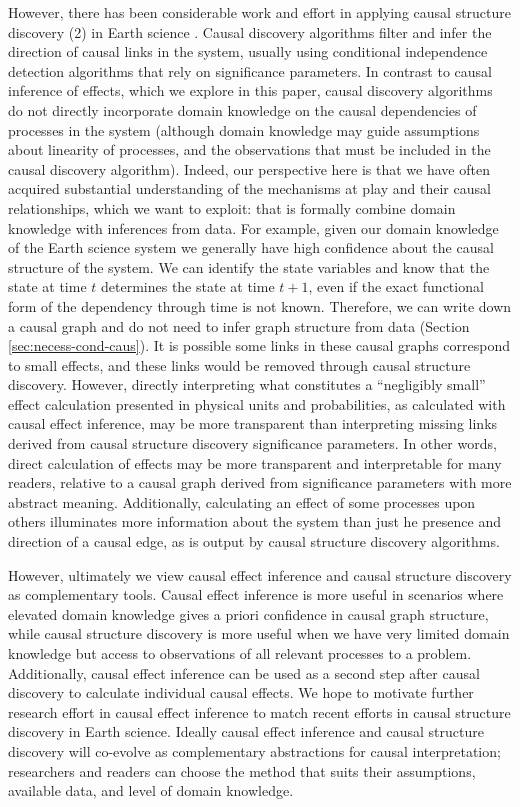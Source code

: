 \documentclass[12pt]{article}
\begin{document}
However, there has been considerable work and effort in applying
causal structure discovery (2) in Earth science
\citep[e.g.,][]{ebert-uphoff2012,
  samarasinghe-casuality,runge-causal-timeseries,runge2019inferring,goodwell-causality-2020}. Causal
discovery algorithms filter and infer the direction of causal links in
the system, usually using conditional independence detection
algorithms that rely on significance parameters. In contrast to causal
inference of effects, which we explore in this paper, causal discovery
algorithms do not directly incorporate domain knowledge on the causal
dependencies of processes in the system (although domain knowledge may
guide assumptions about linearity of processes, and the observations
that must be included in the causal discovery algorithm). Indeed, our
perspective here is that we have often acquired substantial
understanding of the mechanisms at play and their causal
relationships, which we want to exploit: that is formally combine
domain knowledge with inferences from data. For example, given our
domain knowledge of the Earth science system we generally have high
confidence about the causal structure of the system. We can identify
the state variables and know that the state at time \(t\) determines
the state at time \(t+1\), even if the exact functional form of the
dependency through time is not known. Therefore, we can write down a
causal graph and do not need to infer graph structure from data
(Section \ref{sec:necess-cond-caus}). It is possible some links in
these causal graphs correspond to small effects, and these links would
be removed through causal structure discovery. However, directly
interpreting what constitutes a ``negligibly small'' effect
calculation presented in physical units and probabilities, as
calculated with causal effect inference, may be more transparent than
interpreting missing links derived from causal structure discovery
significance parameters. In other words, direct calculation of effects
may be more transparent and interpretable for many readers, relative
to a causal graph derived from significance parameters with more
abstract meaning. Additionally, calculating an effect of some
processes upon others illuminates more information about the system
than just he presence and direction of a causal edge, as is output by
causal structure discovery algorithms.

However, ultimately we view causal effect inference and causal
structure discovery as complementary tools. Causal effect inference is
more useful in scenarios where elevated domain knowledge gives a
priori confidence in causal graph structure, while causal structure
discovery is more useful when we have very limited domain knowledge
but access to observations of all relevant processes to a
problem. Additionally, causal effect inference can be used as a second
step after causal discovery to calculate individual causal effects. We
hope to motivate further research effort in causal effect inference to
match recent efforts in causal structure discovery in Earth
science. Ideally causal effect inference and causal structure
discovery will co-evolve as complementary abstractions for causal
interpretation; researchers and readers can choose the method that
suits their assumptions, available data, and level of domain
knowledge.
\end{document}
